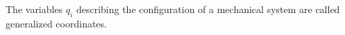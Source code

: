 The variables $q_i$ describing the configuration of a mechanical system are called generalized coordinates.
